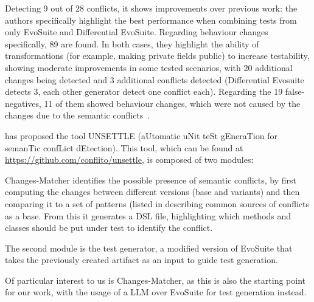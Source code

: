 Detecting 9 out of 28 conflicts, it shows improvements over previous work: the authors specifically highlight the best performance when combining tests from only EvoSuite and Differential EvoSuite. Regarding behaviour changes specifically, 89 are found. 
In both cases, they highlight the ability of transformations (for example, making private fields public) to increase testability, showing moderate improvements in some tested scenarios, with 20 additional changes being detected and 3 additional conflicts detected (Differential Evosuite detects 3, each other generator detect one conflict each).  Regarding the 19 false-negatives, 11 of them showed behaviour changes, which were not caused by the changes due to the semantic conflicts~\cite{kn:leuson2}.


\citet{kn:nuno} has proposed the tool UNSETTLE (aUtomatic uNit teSt gEneraTion for semanTic confLict dEtection). This tool, which can be found at \url{https://github.com/conflito/unsettle}, is composed of two modules:

Changes-Matcher identifies the possible presence of semantic conflicts, by first computing the changes between different versions (base and variants) and then comparing it to a set of patterns (listed in  describing common sources of conflicts as a base. From this it generates a DSL file, highlighting which methods and classes should be put under test to identify the conflict.

The second module is the test generator, a modified version of EvoSuite that takes the previously created artifact as an input to guide test generation.

Of particular interest to us is Changes-Matcher, as this is also the starting point for our work, with the usage of a LLM over EvoSuite for test generation instead.

